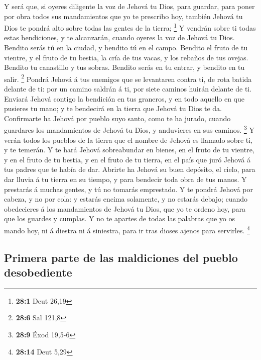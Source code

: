  Y será que, si oyeres diligente la voz de Jehová tu Dios,
para guardar, para poner por obra todos sus mandamientos que yo te
prescribo hoy, también Jehová tu Dios te pondrá alto sobre todas las
gentes de la tierra; \footnote{\textbf{28:1} Deut 26,19}  Y
vendrán sobre ti todas estas bendiciones, y te alcanzarán, cuando oyeres
la voz de Jehová tu Dios.  Bendito serás tú en la ciudad, y
bendito tú en el campo.  Bendito el fruto de tu vientre, y
el fruto de tu bestia, la cría de tus vacas, y los rebaños de tus
ovejas.  Bendito tu canastillo y tus sobras. 
Bendito serás en tu entrar, y bendito en tu salir. \footnote{\textbf{28:6}
  Sal 121,8}  Pondrá Jehová á tus enemigos que se levantaren
contra ti, de rota batida delante de ti: por un camino saldrán á ti, por
siete caminos huirán delante de ti.  Enviará Jehová contigo
la bendición en tus graneros, y en todo aquello en que pusieres tu mano;
y te bendecirá en la tierra que Jehová tu Dios te da. 
Confirmarte ha Jehová por pueblo suyo santo, como te ha jurado, cuando
guardares los mandamientos de Jehová tu Dios, y anduvieres en sus
caminos. \footnote{\textbf{28:9} Éxod 19,5-6}  Y verán
todos los pueblos de la tierra que el nombre de Jehová es llamado sobre
ti, y te temerán.  Y te hará Jehová sobreabundar en bienes,
en el fruto de tu vientre, y en el fruto de tu bestia, y en el fruto de
tu tierra, en el país que juró Jehová á tus padres que te había de dar.
 Abrirte ha Jehová su buen depósito, el cielo, para dar
lluvia á tu tierra en su tiempo, y para bendecir toda obra de tus manos.
Y prestarás á muchas gentes, y tú no tomarás emprestado.  Y
te pondrá Jehová por cabeza, y no por cola: y estarás encima solamente,
y no estarás debajo; cuando obedecieres á los mandamientos de Jehová tu
Dios, que yo te ordeno hoy, para que los guardes y cumplas.
 Y no te apartes de todas las palabras que yo os mando hoy,
ni á diestra ni á siniestra, para ir tras dioses ajenos para servirles.
\footnote{\textbf{28:14} Deut 5,29}

\hypertarget{primera-parte-de-las-maldiciones-del-pueblo-desobediente}{%
\subsection{Primera parte de las maldiciones del pueblo
desobediente}\label{primera-parte-de-las-maldiciones-del-pueblo-desobediente}}

